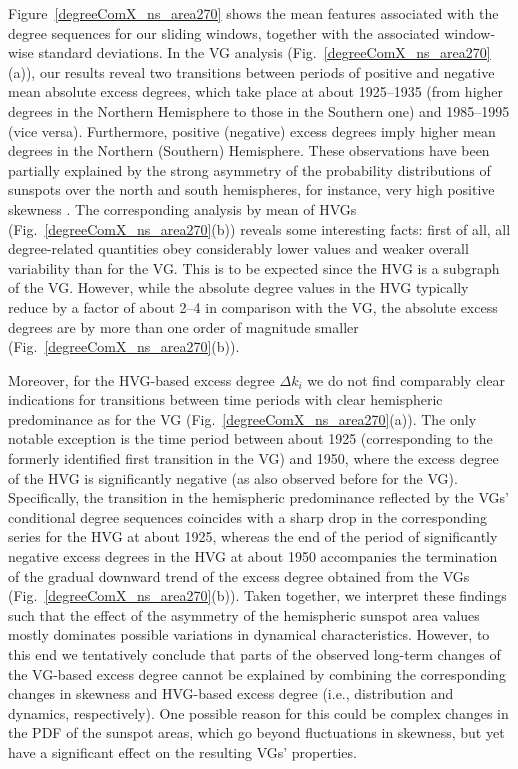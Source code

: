 		Figure~\ref{degreeComX_ns_area270} shows the mean features associated with the degree sequences for our sliding windows, together with the associated window-wise standard deviations. In the VG analysis (Fig.~\ref{degreeComX_ns_area270}(a)), our results reveal two transitions between periods of positive and negative mean absolute excess degrees, which take place at about 1925--1935 (from higher degrees in the Northern Hemisphere to those in the Southern one) and 1985--1995 (vice versa). Furthermore, positive (negative) excess degrees imply higher mean degrees in the Northern (Southern) Hemisphere. These observations have been partially explained by the strong asymmetry of the probability distributions of sunspots over the north and south hemispheres, for instance, very high positive skewness \cite{Zou2014}. The corresponding analysis by mean of HVGs (Fig.~\ref{degreeComX_ns_area270}(b)) reveals some interesting facts: first of all, all degree-related quantities obey considerably lower values and weaker overall variability than for the VG. This is to be expected since the HVG is a subgraph of the VG. However, while the absolute degree values in the HVG typically reduce by a factor of about 2--4 in comparison with the VG, the absolute excess degrees are by more than one order of magnitude smaller (Fig.~\ref{degreeComX_ns_area270}(b)).

		Moreover, for the HVG-based excess degree $\Delta k_i$ we do not find comparably clear indications for transitions between time periods with clear hemispheric predominance as for the VG (Fig.~\ref{degreeComX_ns_area270}(a)). The only notable exception is the time period between about 1925 (corresponding to the formerly identified first transition in the VG) and 1950, where the excess degree of the HVG is significantly negative (as also observed before for the VG). Specifically, the transition in the hemispheric predominance reflected by the VGs' conditional degree sequences coincides with a sharp drop in the corresponding series for the HVG at about 1925, whereas the end of the period of significantly negative excess degrees in the HVG at about 1950 accompanies the termination of the gradual downward trend of the excess degree obtained from the VGs (Fig.~\ref{degreeComX_ns_area270}(b)). Taken together, we interpret these findings such that the effect of the asymmetry of the hemispheric sunspot area values mostly dominates possible variations in dynamical characteristics. However, to this end we tentatively conclude that parts of the observed long-term changes of the VG-based excess degree cannot be explained by combining the corresponding changes in skewness and HVG-based excess degree (i.e., distribution and dynamics, respectively). One possible reason for this could be complex changes in the PDF of the sunspot areas, which go beyond fluctuations in skewness, but yet have a significant effect on the resulting VGs' properties.

